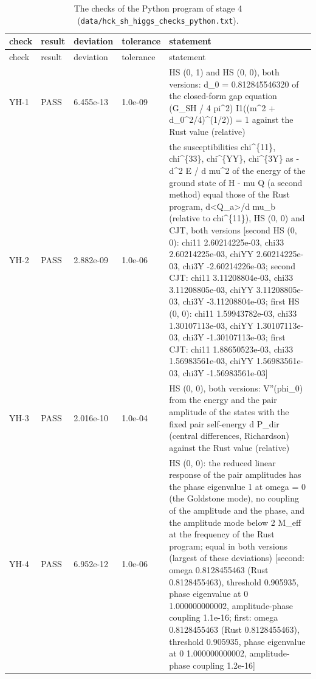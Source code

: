 \documentclass[aps,prd,onecolumn,superscriptaddress,nofootinbib,floatfix,longbibliography]{revtex4-2}
\begin{document}
\begingroup\fontsize{7}{8.5}\selectfont\setlength{\tabcolsep}{3pt}
\begin{longtable}{p{}p{}p{}p{}p{}}
\caption{\label{tab:checks_higgs_python}The checks of the Python program of stage 4 (\texttt{data/hck\_sh\_higgs\_checks\_python.txt}).}\\
\hline\hline
check & result & deviation & tolerance & statement \\ \hline
\endfirsthead
\hline check & result & deviation & tolerance & statement \\ \hline
\endhead
\hline\hline
\endlastfoot
YH-1 & PASS & 6.455e-13 & 1.0e-09 & HS (0, 1) and HS (0, 0), both versions: d\_0 = 0.812845546320 of the closed-form gap equation (G\_SH / 4 pi\textasciicircum{}2) I1((m\textasciicircum{}2 + d\_0\textasciicircum{}2/4)\textasciicircum{}(1/2)) = 1 against the Rust value (relative) \\
YH-2 & PASS & 2.882e-09 & 1.0e-06 & the susceptibilities chi\textasciicircum{}\{11\}, chi\textasciicircum{}\{33\}, chi\textasciicircum{}\{YY\}, chi\textasciicircum{}\{3Y\} as -d\textasciicircum{}2 E / d mu\textasciicircum{}2 of the energy of the ground state of H - mu Q (a second method) equal those of the Rust program, d\textless{}Q\_a\textgreater{}/d mu\_b (relative to chi\textasciicircum{}\{11\}), HS (0, 0) and CJT, both versions [second HS (0, 0): chi11 2.60214225e-03, chi33 2.60214225e-03, chiYY 2.60214225e-03, chi3Y -2.60214226e-03; second CJT: chi11 3.11208804e-03, chi33 3.11208805e-03, chiYY 3.11208805e-03, chi3Y -3.11208804e-03; first HS (0, 0): chi11 1.59943782e-03, chi33 1.30107113e-03, chiYY 1.30107113e-03, chi3Y -1.30107113e-03; first CJT: chi11 1.88650523e-03, chi33 1.56983561e-03, chiYY 1.56983561e-03, chi3Y -1.56983561e-03] \\
YH-3 & PASS & 2.016e-10 & 1.0e-04 & HS (0, 0), both versions: V''(phi\_0) from the energy and the pair amplitude of the states with the fixed pair self-energy d P\_dir (central differences, Richardson) against the Rust value (relative) \\
YH-4 & PASS & 6.952e-12 & 1.0e-06 & HS (0, 0): the reduced linear response of the pair amplitudes has the phase eigenvalue 1 at omega = 0 (the Goldstone mode), no coupling of the amplitude and the phase, and the amplitude mode below 2 M\_eff at the frequency of the Rust program; equal in both versions (largest of these deviations) [second: omega 0.8128455463 (Rust 0.8128455463), threshold 0.905935, phase eigenvalue at 0 1.000000000002, amplitude-phase coupling 1.1e-16; first: omega 0.8128455463 (Rust 0.8128455463), threshold 0.905935, phase eigenvalue at 0 1.000000000002, amplitude-phase coupling 1.2e-16] \\

\end{longtable}
\end{document}

